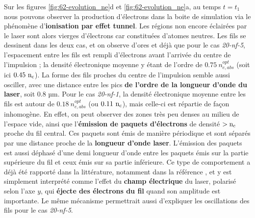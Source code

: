 \begin{refsection}
Sur les figures \ref{fig:62-evolution_ne}d et \ref{fig:62-evolution_ne}a, au temps $t=t_1$ nous pouvons observer la production d'électrons dans la boite de simulation via le phénomène d'\textbf{ionisation par effet tunnel}. Les régions non encore éclairées par le laser sont alors vierges d'électrons car constituées d'atomes neutres. Les fils se dessinent dans les deux cas, et on observe d'ores et déjà que pour le cas \textit{20-nf-5}, l’espacement entre les fils est rempli d'électrons avant l'arrivée du centre de l'impulsion ; la densité électronique moyenne y étant de l'ordre de $0.75 ~ n_{e,abs}^{opt}$ (soit ici $0.45 ~ \rm n_c$). La forme des fils proches du centre de l'impulsion semble aussi osciller, avec une distance entre les pics \textbf{de l'ordre de la longueur d'onde du laser}, soit 0.8 µm. Pour le cas \textit{20-nf-1}, la densité électronique moyenne entre les fils est autour de $0.18 ~ n_{e,abs}^{opt}$ (ou $0.11 ~ \rm n_c$), mais celle-ci est répartie de façon inhomogène. En effet, on peut observer des zones très peu denses au milieu de l'espace vide, ainsi que l'\textbf{émission de paquets d'électrons} de densité $> \rm n_c$ proche du fil central. Ces paquets sont émis de manière périodique et sont séparés par une distance proche de la \textbf{longueur d'onde laser}. L'émission des paquets est aussi déphasé d'une demi longueur d'onde entre les paquets émis sur la partie supérieure du fil et ceux émis sur sa partie inférieure. Ce type de comportement a déjà été rapporté dans la littérature, notamment dans la référence \cite{jiang_2014}, et y est simplement interprété comme l'effet du \textbf{champ électrique} du laser, polarisé selon l'axe $y$, qui \textbf{éjecte des électrons du fil} quand son amplitude est importante. Le même mécanisme permettrait aussi d'expliquer les oscillations des fils pour le cas \textit{20-nf-5}.


\end{refsection}
